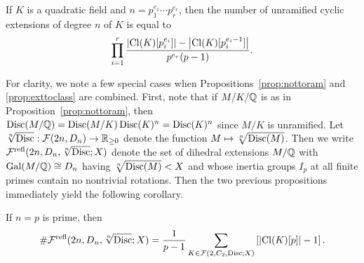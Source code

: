 \begin{prop}\label{prop:exttoclass}
  If $K$ is a quadratic field and $n = p_1^{e_1} \cdots p_r^{e_r}$, then the number
  of unramified cyclic extensions of degree $n$ of $K$ is equal to
  \begin{equation}\label{eqn:exttoclass}
    \prod_{i=1}^r \frac{\left|\operatorname{Cl}(K)[p_i^{e_i}]\right| - \left|\operatorname{Cl}(K)[p_i^{e_i-1}]\right|}{p^{e_r}(p - 1)}.
  \end{equation}
\end{prop}

For clarity, we note a few special cases when Propositions~\ref{prop:nottoram}
and \ref{prop:exttoclass} are combined. First, note that if $M/K/\mathbb{Q}$ is as in
Proposition~\ref{prop:nottoram}, then $\operatorname{Disc}(M/\mathbb{Q}) = \operatorname{Disc}(M/K)\operatorname{Disc}(K)^n =
\operatorname{Disc}(K)^n$ since $M/K$ is unramified. Let $\sqrt[n]{\operatorname{Disc}} : \mathcal{F}(2n, D_n) \to
\mathbb{R}_{\geq 0}$ denote the function $M \mapsto \sqrt[n]{\operatorname{Disc}(M)}$. Then we write
$\mathcal{F}^{\mathrm{refl}}(2n, D_n, \sqrt[n]{\operatorname{Disc}}; X)$ denote the set of dihedral
extensions $M/\mathbb{Q}$ with $\operatorname{Gal}(M/\mathbb{Q}) \cong D_n$ having $\sqrt[n]{\operatorname{Disc}(M)} < X$
and whose inertia groups $I_p$ at all finite primes contain no nontrivial
rotations. Then the two previous propositions immediately yield the following
corollary.

\begin{cor}\label{cor:oddprimeclass}
  If $n = p$ is prime, then
 \[ \# \mathcal{F}^{\mathrm{refl}}(2n, D_n, \sqrt[n]{\operatorname{Disc}}; X) = \frac{1}{p-1} \sum_{K \in \mathcal{F}(2, C_2, \operatorname{Disc}; X)} \left[\left|\operatorname{Cl}(K)[p]\right| - 1\right]. \]
\end{cor}

